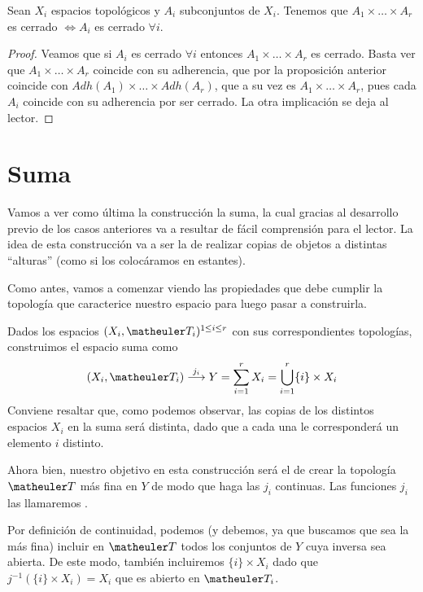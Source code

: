 \begin{prop}[Cerrados]
	Sean $X_i$ espacios topológicos y $A_i$ subconjuntos de $X_i$. Tenemos que
	$A_1 \times \dots \times A_r$ es cerrado $\iff A_i$ es cerrado $\forall i$.
\end{prop}
\begin{proof}
	Veamos que si $A_i$ es cerrado $\forall i$ entonces $A_1 \times \dots \times A_r$ es cerrado. Basta ver que $A_1 \times \dots \times A_r$ coincide con su adherencia, que por la proposición anterior coincide con $Adh(A_1) \times \dots \times Adh(A_r)$, que a su vez es $A_1 \times \dots \times A_r$, pues cada $A_i$ coincide con su adherencia por ser cerrado.
	La otra implicación se deja al lector.
\end{proof}	

		
\section{Suma}
Vamos a ver como última la construcción la suma, la cual gracias al desarrollo previo de los casos anteriores va a resultar de fácil comprensión para el lector. La idea de esta construcción va a ser la de realizar copias de objetos a distintas ``alturas'' (como si los colocáramos en estantes). 

Como antes, vamos a comenzar viendo las propiedades que debe cumplir la topología que caracterice nuestro espacio para luego pasar a construirla.

Dados los espacios $(X_i, \T_i)^{1\le i \le r}$ con sus correspondientes topologías, construimos el espacio suma como
\begin{equation}
(X_i, \T_i)\stackrel{j_i}\longrightarrow Y=\sum_{i=1}^rX_i=\bigcup_{i=1}^r\{i\}\times X_i
\end{equation}
Conviene resaltar que, como podemos observar, las copias de los distintos espacios $X_i$ en la suma será distinta, dado que a cada una le corresponderá un elemento $i$ distinto.

Ahora bien, nuestro objetivo en esta construcción será el de crear la topología $\T$ más fina en $Y$ de modo que haga las $j_i$ continuas. Las funciones $j_i$ las llamaremos .

Por definición de continuidad, podemos (y debemos, ya que buscamos que sea la más fina) incluir en $\T$ todos los conjuntos de $Y$ cuya inversa sea abierta.
De este modo, también incluiremos $\{i\}\times X_i$ dado que $j^{-1}(\{i\}\times X_i)=X_i$ que es abierto en $\T_i$.

